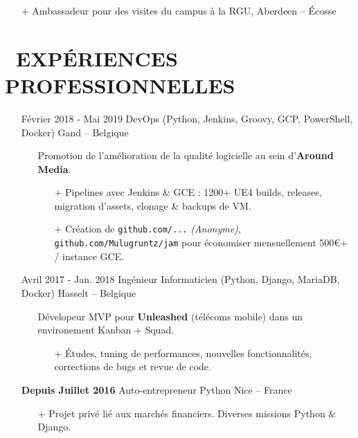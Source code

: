 \documentclass{res}
\begin{document}
\begin{resume}
\begin{itemize}
\begin{itemize}
                  \item[+]  Ambassadeur pour des visites du campus \`a la RGU, Aberdeen -- \'Ecosse
		\end{itemize} 
	\end{itemize}

\pagebreak

\section{\faBriefcase~EXP\'ERIENCES PROFESSIONNELLES}

	\begin{itemize}
		\item[] F\'evrier  2018 - Mai 2019 \tabto{5cm} DevOps (Python, Jenkins, Groovy, GCP, PowerShell, Docker) \hfill Gand -- Belgique
		\begin{itemize}
			\item[] Promotion de l'am\'elioration de la qualit\'e logicielle au sein d'\textbf{Around Media}.
			\begin{itemize}
				\item[+] Pipelines avec Jenkins \& GCE : 1200+ UE4 builds, releases, migration d'assets, clonage \& backups de VM.
				\item[+] Cr\'eation de \ifisanon \texttt{github.com/...} \textit{(Anonyme)}, \else \texttt{github.com/Mulugruntz/jam} \fi pour \'economiser mensuellement 500\euro+ / instance GCE.
			\end{itemize}
		\end{itemize}
		\item[] Avril 2017 - Jan. 2018 \tabto{5cm} Ing\'enieur Informaticien (Python, Django, MariaDB, Docker) \hfill Hasselt -- Belgique
		\begin{itemize}
			\item[] D\'evelopeur MVP pour \textbf{Unleashed} (t\'el\'ecoms mobile) dans un environement Kanban + Squad.
			\begin{itemize}
				\item[+] \'Etudes, tuning de performances, nouvelles fonctionnalit\'es, corrections de bugs et revue de code.
			\end{itemize}
		\end{itemize}
		\item[] \textbf{Depuis Juillet 2016} \tabto{5cm} Auto-entrepreneur Python \hfill Nice -- France
		\begin{itemize}
			\item[+] Projet priv\'e li\'e aux march\'es financiers. Diverses missions Python \& Django.

\end{itemize}
\end{itemize}
\end{resume}
\end{document}
